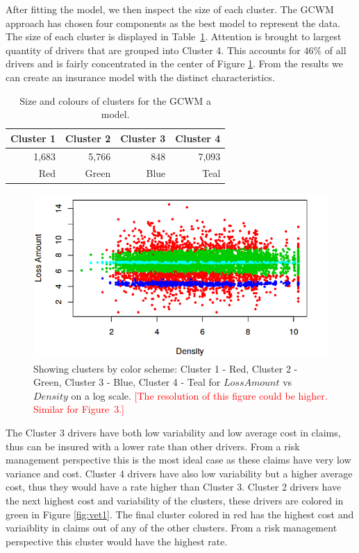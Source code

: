 \documentclass[11pt,letterpaper]{article}
\numberwithin{equation}{section}
\numberwithin{equation}{section}
\numberwithin{equation}{section}
\begin{document}
After fitting the model, we then inspect the size of each cluster. The GCWM approach has chosen four components as the best model to represent the data. The size of each cluster is displayed in Table~\ref{table:sizeSev}. Attention is brought to largest quantity of drivers that are grouped into Cluster 4. This accounts for $ 46 \% $ of all drivers and is fairly concentrated in the center of Figure \ref{fig:vet1a}. From the results we can create an insurance model with the distinct characteristics.
\begin{table}[!htb]
\centering
\caption{Size and colours of clusters for the GCWM a model.}
\label{table:sizeSev}
\begin{tabular}{rrrr}
\hline
Cluster 1   & Cluster 2  & Cluster 3   & Cluster 4    \\
\hline
1,683 & 5,766 & 848 & 7,093 \\
Red & Green & Blue & Teal \\
\hline
\end{tabular}
\end{table}
\begin{figure}[!htb]
\begin{center}
\includegraphics[scale=0.70]{SeverityPlot}
\end{center}
\vspace{-0.2in}
\caption{Showing clusters by color scheme: Cluster 1 - Red, Cluster 2 - Green, Cluster 3 - Blue, Cluster 4 - Teal for $LossAmount$ vs $Density$ on a log scale. \textcolor{red}{[The resolution of this figure could be higher. Similar for Figure~3.]}}
\label{fig:vet1a}
\end{figure}


The Cluster 3 drivers have both low variability and low average cost in claims, thus can be insured with a lower rate than other drivers. From a risk management perspective this is the most ideal case as these claims have very low variance and cost. Cluster 4 drivers have also low variability but a higher average cost, thus they would have a rate higher than Cluster 3. Cluster 2 drivers have the next highest cost and variability of the clusters, these drivers are colored in green in Figure \ref{fig:vet1}. The final cluster colored in red has the highest cost and variaiblity in claims out of any of the other clusters. From a risk management perspective this cluster would have the highest rate.
\end{document}

